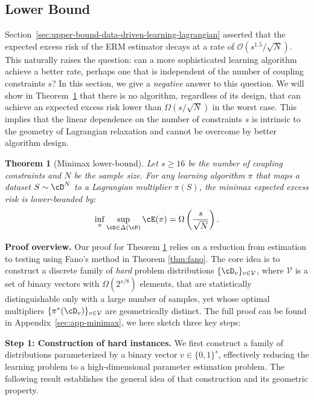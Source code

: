 \documentclass{article}
\theoremstyle{plain}
\newtheorem{theorem}{Theorem}[section]
\theoremstyle{definition}
\theoremstyle{remark}
\begin{document}
\subsection{Lower Bound} \label{sec:lower-bound}


Section~\ref{sec:upper-bound-data-driven-learning-lagrangian} asserted that the expected excess risk of the ERM estimator decays at a rate of $\mathcal{O}(s^{1.5}/\sqrt{N})$. This naturally raises the question: can a more sophisticated learning algorithm achieve a better rate, perhaps one that is independent of the number of coupling constraints $s$? In this section, we give a \emph{negative} answer to this question. We will show in Theorem~\ref{thm:minimax-lower-bound} that there is no algorithm, regardless of its design, that can achieve an expected excess risk lower than $\Omega(s/\sqrt{N})$ in the worst case. This implies that the linear dependence on the number of constraints $s$ is intrinsic to the geometry of Lagrangian relaxation and cannot be overcome by better algorithm design.

\begin{theorem}[Minimax lower-bound] \label{thm:minimax-lower-bound}
    Let $s \geq 16$ be the number of coupling constraints and $N$ be the sample size. For any learning algorithm $\pi$ that maps a dataset $S \sim \cD^N$ to a Lagrangian multiplier $\pi(S)$, the minimax expected excess risk is lower-bounded by:
    \[
        \inf_{\pi} \sup_{\cD \in \Delta(\cP)} \cE(\pi) = \Omega\left(\frac{s}{\sqrt{N}}\right).
    \]
\end{theorem}

\textbf{Proof overview.} Our proof for Theorem \ref{thm:minimax-lower-bound} relies on a reduction from estimation to testing using Fano's method in Theorem \ref{thm:fano}. The core idea is to construct a discrete family of \textit{hard} problem distributions $\{\cD_v\}_{v \in \mathcal V}$, where $\mathcal V$ is a set of binary vectors with $\Omega(2^{s/8})$ elements, that are statistically distinguishable only with a large number of samples, yet whose optimal multipliers $\{\pi^*(\cD_v)\}_{v \in \mathcal V}$ are geometrically distinct. The full proof  can be found in Appendix~\ref{sec:app-minimax}, we here sketch three key steps:

\textbf{Step 1: Construction of hard instances.} We first construct a family of distributions parameterized by a binary vector $v \in \{0, 1\}^s$, effectively reducing the learning problem to a high-dimensional parameter estimation problem. The following result establishes the general idea of that construction and its geometric property.
\end{document}
